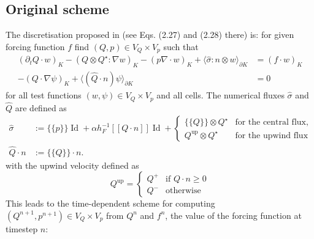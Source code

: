 \documentclass[11pt]{article}
\newcommand{\jump}[1]{[\![ #1]\!]}
\newcommand{\avg}[1]{\{\!\{#1\}\!\}}
\newcommand{\Id}{\operatorname{Id}}
\begin{document}
\subsection{Original scheme}
The discretisation proposed in \cite{Guzman2016} (see Eqs. (2.27) and (2.28) there) is: for given forcing function $f$ find $(Q,p)\in V_Q\times V_p$ such that
\begin{equation}
    \begin{aligned}
        (\partial_t Q\cdot w)_{K} - (Q\otimes Q^\star:\nabla w)_{K} - (p\nabla\cdot w)_{K} + \langle \widehat{\sigma}: n\otimes w \rangle_{\partial K} & = (f\cdot w)_{K} \\
        - (Q\cdot \nabla \psi)_{K} + \langle (\widehat{Q}\cdot n)\psi\rangle_{\partial K}                                                              & =0
    \end{aligned}
\end{equation}
for all test functions $(w,\psi)\in V_Q\times V_p$ and all cells. The numerical fluxes $\widehat{\sigma}$ and $\widehat{Q}$ are defined as
\begin{equation}
    \begin{aligned}
        \widehat{\sigma}   & := \avg{p} \Id  + \alpha h_F^{-1} \jump{Q\cdot n} \Id       + \begin{cases}
                                                                                               \avg{Q}\otimes Q^\star       & \text{for the central flux}, \\
                                                                                               Q^{\text{up}}\otimes Q^\star & \text{for the upwind flux}
                                                                                           \end{cases} \\
        \widehat{Q}\cdot n & := \avg{Q}\cdot n.
    \end{aligned}\label{eqn:flux_original}
\end{equation}
with the upwind velocity defined as
\begin{equation}
    Q^\text{up} = \begin{cases}
        Q^+ & \text{if $Q\cdot n\ge 0$} \\
        Q^- & \text{otherwise}
    \end{cases}
\end{equation}
This leads to the time-dependent scheme for computing $(Q^{n+1},p^{n+1})\in V_Q\times V_p$ from $Q^n$ and $f^n$, the value of the forcing function at timestep $n$:
\end{document}
